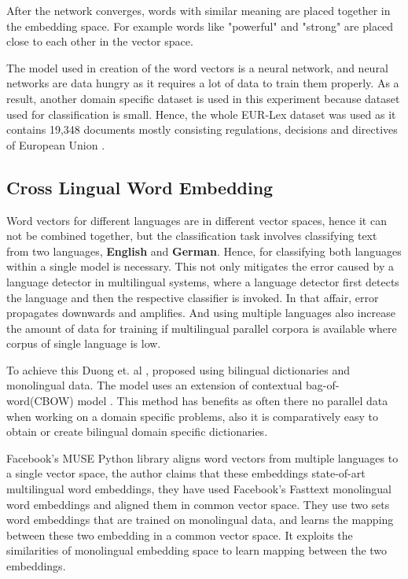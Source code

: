 After the network converges, words with similar meaning are placed together in the embedding space. For example words like "powerful" and "strong" are placed close to each other in the vector space. 



The model used in creation of the word vectors is a neural network, and neural networks are data hungry as it requires a lot of data to train them properly. As a result, another domain specific dataset is used in this experiment because dataset used for classification is small. Hence, the whole EUR-Lex dataset was used as it contains 19,348 documents mostly consisting regulations, decisions and directives of European Union \cite{jf:SemanticLaw}.

\subsection{Cross Lingual Word Embedding}\label{backgroundCrosslingual}

Word vectors for different languages are in different vector spaces, hence it can not be combined together, but the classification task involves classifying text from two languages, \textbf{English} and \textbf{German}. Hence, for classifying both languages within a single model is necessary. This not only mitigates the error caused by a language detector in multilingual systems, where a language detector first detects the language and then the respective classifier is invoked. In that affair, error propagates downwards and amplifies. And using multiple languages also increase the amount of data for training if multilingual parallel corpora is available where corpus of single language is low. 

To achieve this Duong et. al \cite{duong-EtAl:2016:EMNLP}, proposed using bilingual dictionaries and monolingual data. The model uses an extension of contextual bag-of-word(CBOW) model \cite{mikolov2013efficient}. This method has benefits as often there no parallel data when working on a domain specific problems, also it is comparatively easy to obtain or create bilingual domain specific dictionaries.

Facebook's MUSE Python library \cite{conneau2017word} aligns word vectors from multiple languages to a single vector space, the author claims that these embeddings state-of-art multilingual word embeddings, they have used Facebook's Fasttext \cite{bojanowski2017enriching} monolingual word embeddings and aligned them in common vector space. They use two sets word embeddings that are trained on monolingual data, and learns the mapping between these two embedding in a common vector space. It exploits the similarities of monolingual embedding space \cite{mikolov2013exploiting} to learn mapping between the two embeddings.

